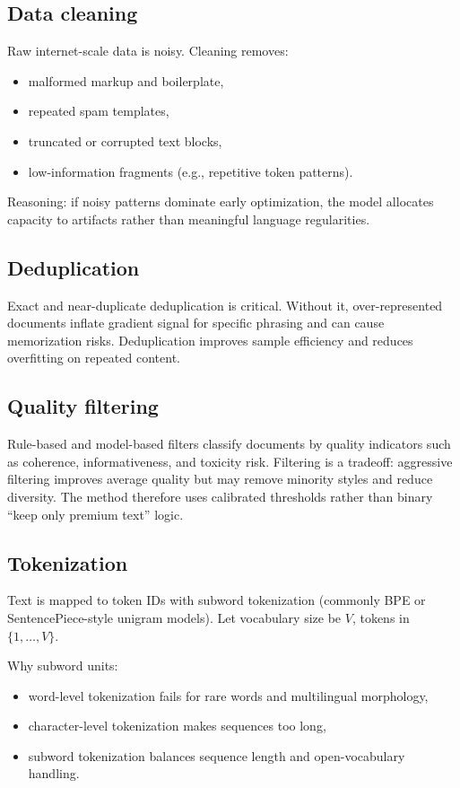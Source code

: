 \documentclass[12pt]{article}
\begin{document}
\subsection{Data cleaning}

Raw internet-scale data is noisy. Cleaning removes:
\begin{itemize}
    \item malformed markup and boilerplate,
    \item repeated spam templates,
    \item truncated or corrupted text blocks,
    \item low-information fragments (e.g., repetitive token patterns).
\end{itemize}
Reasoning: if noisy patterns dominate early optimization, the model allocates capacity to artifacts rather than meaningful language regularities.

\subsection{Deduplication}

Exact and near-duplicate deduplication is critical. Without it, over-represented documents inflate gradient signal for specific phrasing and can cause memorization risks. Deduplication improves sample efficiency and reduces overfitting on repeated content.

\subsection{Quality filtering}

Rule-based and model-based filters classify documents by quality indicators such as coherence, informativeness, and toxicity risk. Filtering is a tradeoff: aggressive filtering improves average quality but may remove minority styles and reduce diversity. The method therefore uses calibrated thresholds rather than binary ``keep only premium text'' logic.

\subsection{Tokenization}

Text is mapped to token IDs with subword tokenization (commonly BPE or SentencePiece-style unigram models). Let vocabulary size be \(V\), tokens in \(\{1,\dots,V\}\).

Why subword units:
\begin{itemize}
    \item word-level tokenization fails for rare words and multilingual morphology,
    \item character-level tokenization makes sequences too long,
    \item subword tokenization balances sequence length and open-vocabulary handling.
\end{itemize}
\end{document}
